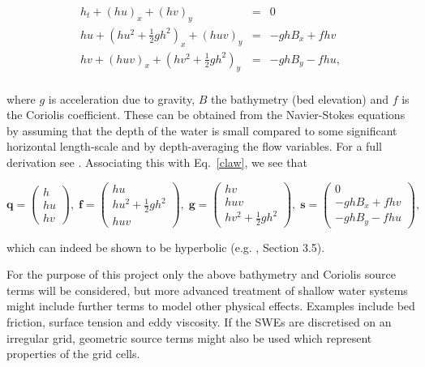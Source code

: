 \documentclass[a4paper,onecolumn,11pt]{article}
\renewcommand{\vec}[1]{\ensuremath{\mathbf{#1}}}
\begin{document}
\begin{assignment}
\begin{eqnarray*}
                        h_t + (hu)_x + (hv)_y & = & 0 \\
    hu + (hu^2 + \frac{1}{2}gh^2)_x + (huv)_y & = & - ghB_x + fhv \\
    hv + (huv)_x + (hv^2 + \frac{1}{2}gh^2)_y & = & - ghB_y - fhu, \\
\end{eqnarray*}

where $g$ is acceleration due to gravity, $B$ the bathymetry (bed elevation) and $f$ is the Coriolis coefficient. These can be obtained from the Navier-Stokes equations by assuming that the depth of the water is small compared to some significant horizontal length-scale and by depth-averaging the flow variables. For a full derivation see \citet{dellar2005shallow}. Associating this with Eq.~\ref{claw}, we see that

$$
    \vec{q} = \left( \begin{array}{c}
        h \\
        hu \\
        hv
    \end{array} \right),\;
    \vec{f} = \left( \begin{array}{c}
        hu \\
        hu^2 + \frac{1}{2}gh^2 \\
        huv
    \end{array} \right),\;
    \vec{g} = \left( \begin{array}{c}
        hv \\
        huv \\
        hv^2 + \frac{1}{2}gh^2
    \end{array} \right),\;
    \vec{s} = \left( \begin{array}{c}
        0 \\
        - ghB_x + fhv \\
        - ghB_y - fhu
    \end{array} \right),
$$

which can indeed be shown to be hyperbolic (e.g. \citet{toro2001shock}, Section 3.5).

For the purpose of this project only the above bathymetry and Coriolis source terms will be considered, but more advanced treatment of shallow water systems might include further terms to model other physical effects. Examples include bed friction, surface tension and eddy viscosity. If the SWEs are discretised on an irregular grid, geometric source terms might also be used which represent properties of the grid cells.


\end{assignment}
\end{document}
